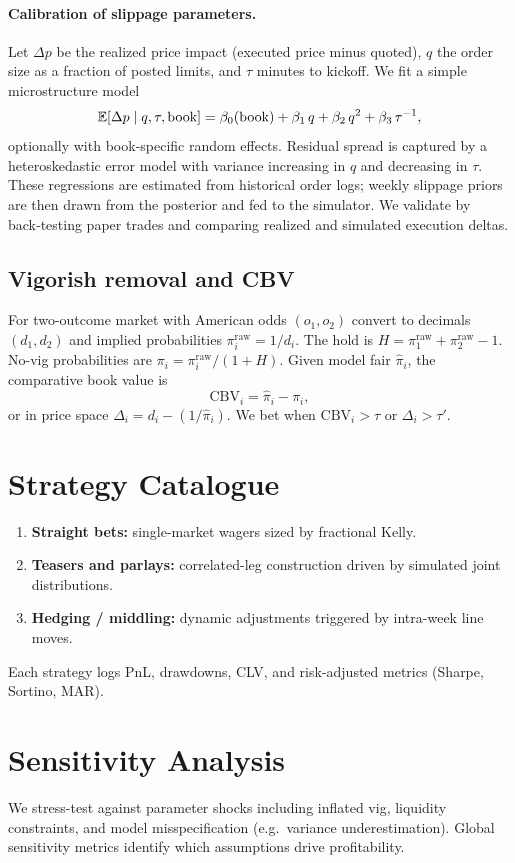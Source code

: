 \paragraph{Calibration of slippage parameters.}
Let $\Delta p$ be the realized price impact (executed price minus quoted), $q$ the order size as a fraction of posted limits, and $\tau$ minutes to kickoff. We fit a simple microstructure model
\[\mathbb{E}[\Delta p\mid q,\tau,\text{book}]=\beta_0(\text{book})+\beta_1\,q+\beta_2\,q^2+\beta_3\,\tau^{-1},\]
optionally with book‑specific random effects. Residual spread is captured by a heteroskedastic error model with variance increasing in $q$ and decreasing in $\tau$. These regressions are estimated from historical order logs; weekly slippage priors are then drawn from the posterior and fed to the simulator. We validate by back‑testing paper trades and comparing realized and simulated execution deltas.

\subsection{Vigorish removal and CBV}\label{subsec:vig-cbv}
For two-outcome market with American odds $(o_1,o_2)$ convert to decimals $(d_1,d_2)$ and implied
probabilities $\pi_i^{\mathrm{raw}}=1/d_i$. The hold is $H=\pi_1^{\mathrm{raw}}+\pi_2^{\mathrm{raw}}-1$.
No-vig probabilities are $\pi_i=\pi_i^{\mathrm{raw}}/(1+H)$. Given model fair $\hat\pi_i$, the
comparative book value is
\[
\mathrm{CBV}_i=\hat\pi_i-\pi_i,
\]
or in price space $\Delta_i = d_i - (1/\hat\pi_i)$. We bet when $\mathrm{CBV}_i>\tau$ or $\Delta_i>\tau'$.

\section{Strategy Catalogue}
\begin{enumerate}
  \item \textbf{Straight bets:} single-market wagers sized by fractional Kelly.
  \item \textbf{Teasers and parlays:} correlated-leg construction driven by simulated joint distributions.
  \item \textbf{Hedging / middling:} dynamic adjustments triggered by intra-week line moves.
\end{enumerate}
Each strategy logs PnL, drawdowns, CLV, and risk-adjusted metrics (Sharpe, Sortino, MAR).

\section{Sensitivity Analysis}
We stress-test against parameter shocks including inflated vig, liquidity constraints, and model misspecification (e.g.\ variance underestimation). Global sensitivity metrics identify which assumptions drive profitability.

